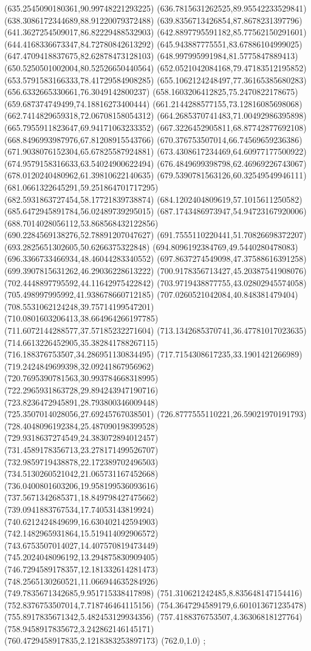 {(635.2545090180361,90.99748221293225)
(636.7815631262525,89.95542233529841)
(638.3086172344689,88.91220079372488)
(639.8356713426854,87.8678231397796)
(641.3627254509017,86.82229488532903)
(642.8897795591182,85.77562150291601)
(644.4168336673347,84.72780842613292)
(645.943887775551,83.67886104999025)
(647.4709418837675,82.62878473128103)
(648.997995991984,81.5775847889413)
(650.5250501002004,80.52526650440564)
(652.0521042084168,79.47183512195852)
(653.5791583166333,78.41729584908285)
(655.1062124248497,77.36165385680283)
(656.6332665330661,76.3049142800237)
(658.1603206412825,75.2470822178675)
(659.687374749499,74.18816273400444)
(661.2144288577155,73.12816085698068)
(662.7414829659318,72.06708158054312)
(664.2685370741483,71.00492986395898)
(665.7955911823647,69.94171063233352)
(667.3226452905811,68.87742877692108)
(668.8496993987976,67.81208915543766)
(670.376753507014,66.74569659236386)
(671.9038076152304,65.67825587924881)
(673.4308617234469,64.60977177500922)
(674.9579158316633,63.54024900622494)
(676.4849699398798,62.46969226743067)
(678.0120240480962,61.39810622140635)
(679.5390781563126,60.32549549946111)
(681.0661322645291,59.251864701717295)
(682.5931863727454,58.17721839738874)
(684.1202404809619,57.1015611250582)
(685.6472945891784,56.02489739295015)
(687.1743486973947,54.94723167920006)
(688.7014028056112,53.868568432122856)
(690.2284569138276,52.78891207047627)
(691.7555110220441,51.70826698372207)
(693.2825651302605,50.6266375322848)
(694.8096192384769,49.5440280478083)
(696.3366733466934,48.46044283340552)
(697.8637274549098,47.37588616391258)
(699.3907815631262,46.29036228613222)
(700.9178356713427,45.20387541908076)
(702.4448897795592,44.11642975422842)
(703.9719438877755,43.02802945574058)
(705.498997995992,41.938678660712185)
(707.0260521042084,40.848381479404)
(708.5531062124248,39.75714199547201)
(710.0801603206413,38.664964266197785)
(711.6072144288577,37.57185232271604)
(713.1342685370741,36.47781017023635)
(714.6613226452905,35.382841788267115)
(716.188376753507,34.286951130834495)
(717.7154308617235,33.1901421266989)
(719.2424849699398,32.09241867956962)
(720.7695390781563,30.993784668318995)
(722.2965931863728,29.894243947190716)
(723.8236472945891,28.793800346009448)
(725.3507014028056,27.69245767038501)
(726.8777555110221,26.59021970191793)
(728.4048096192384,25.487090198399528)
(729.9318637274549,24.383072894012457)
(731.4589178356713,23.278171499526707)
(732.9859719438878,22.172389702496503)
(734.5130260521042,21.065731167452668)
(736.0400801603206,19.958199536093616)
(737.5671342685371,18.849798427475662)
(739.0941883767534,17.74053143819924)
(740.6212424849699,16.630402142594903)
(742.1482965931864,15.519414092906572)
(743.6753507014027,14.407570819473449)
(745.2024048096192,13.294875830909405)
(746.7294589178357,12.181332614281473)
(748.2565130260521,11.066944635284926)
(749.7835671342685,9.951715338417898)
(751.310621242485,8.835648147154416)
(752.8376753507014,7.718746464115156)
(754.3647294589179,6.601013671235478)
(755.8917835671342,5.482453129934356)
(757.4188376753507,4.36306818127764)
(758.9458917835672,3.242862146145171)
(760.4729458917835,2.1218383253897173)
(762.0,1.0)
};
